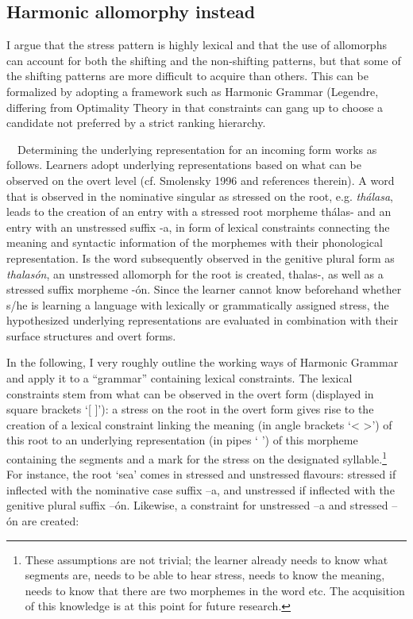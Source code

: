 \documentclass[a4paper]{article}
\begin{document}
\subsection{
Harmonic allomorphy instead}


I argue that the stress pattern is highly lexical and that the use of allomorphs can account for both the shifting and the non-shifting patterns, but that some of the shifting patterns are more difficult to acquire than others. This can be formalized by adopting a framework such as Harmonic Grammar ({Legendre}, differing from Optimality Theory in that constraints can gang up to choose a candidate not preferred by a strict ranking hierarchy.

\ \ Determining the underlying representation for an incoming form works as follows. Learners adopt underlying representations based on what can be observed on the overt level (cf. Smolensky 1996 and references therein). A word that is observed in the nominative singular as stressed on the root, e.g. \textit{thálasa}, leads to the creation of an entry with a stressed root morpheme {\textbar}thálas-{\textbar} and an entry with an unstressed suffix {\textbar}-a{\textbar}, in form of lexical constraints connecting the meaning and syntactic information of the morphemes with their phonological representation. Is the word subsequently observed in the genitive plural form as \textit{thalasón}, an unstressed allomorph for the root is created, {\textbar}thalas-{\textbar}, as well as a stressed suffix morpheme {\textbar}-ón{\textbar}. Since the learner cannot know beforehand whether s/he is learning a language with lexically or grammatically assigned stress, the hypothesized underlying representations are evaluated in combination with their surface structures and overt forms.

In the following, I very roughly outline the working ways of Harmonic Grammar and apply it to a “grammar” containing lexical constraints. The lexical constraints stem from what can be observed in the overt form (displayed in square brackets ‘[ ]’): a stress on the root in the overt form gives rise to the creation of a lexical constraint linking the meaning (in angle brackets ‘{\textless} {\textgreater}’) of this root to an underlying representation (in pipes ‘{\textbar} {\textbar}’) of this morpheme containing the segments and a mark for the stress on the designated syllable.\footnote{ These assumptions are not trivial; the learner already needs to know what segments are, needs to be able to hear stress, needs to know the meaning, needs to know that there are two morphemes in the word etc. The acquisition of this knowledge is at this point for future research.} For instance, the root ‘sea’ comes in stressed and unstressed flavours: stressed if inflected with the nominative case suffix –a, and unstressed if inflected with the genitive plural suffix –ón. Likewise, a constraint for unstressed –a and stressed –ón are created:
\end{document}
